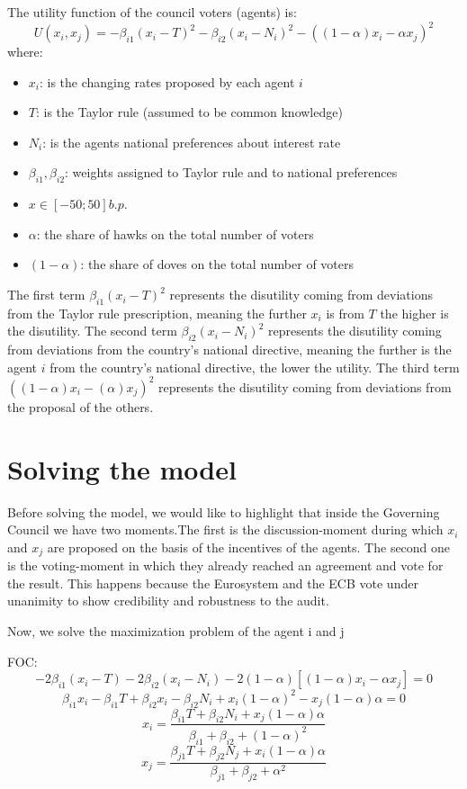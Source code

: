 \documentclass[12pt]{article}
\begin{document}
\vspace{8pt}
The utility function of the council voters (agents) is:
\[ U(x_i,x_{j})=-\beta_{i1}(x_i-T)^2-\beta_{i2} (x_i-N_i)^2 - ((1 - \alpha) x_i - \alpha x_j)^2\]
where:
\begin{itemize}
    \item $x_i$: is the changing rates proposed by each agent $i$
    \item $T$: is the Taylor rule (assumed to be common knowledge)
    \item $N_i$: is the agents national preferences about interest rate
    \item $\beta_{i1},\beta_{i2}$: weights assigned to Taylor rule and to national preferences
    \item $x\in[-50;50] b.p.$
    \item $\alpha$: the share of hawks on the total number of voters
    \item $(1-\alpha)$: the share of doves on the total number of voters
\end{itemize}
The first term $\beta_{i1}(x_i-T)^2$ represents the disutility coming from deviations from the Taylor rule prescription,
meaning the further  $x_i$ is from $T$ the higher is the disutility. The second term $ \beta_{i2}(x_i-N_i)^2$ represents
the disutility coming  from deviations from the country's national directive, meaning the further is the agent $i$ from
the country's national directive, the lower the utility. The third term $((1-\alpha)x_i-(\alpha)x_j)^2$ represents the disutility coming  from deviations from the proposal of the others.

\section{Solving the model}
Before solving the model, we would like to highlight that inside the Governing Council we have two moments.The first is the discussion-moment during which $x_i$ and $x_j$ are proposed on the basis of the incentives of the agents. The second one is the voting-moment in which they already reached an agreement and vote for the result. This happens because the Eurosystem and the ECB vote under unanimity to show credibility and robustness to the audit. 

Now, we solve the maximization problem of the agent i and j\par
FOC:
\[ -2\beta_{i1}(x_i-T)-2\beta_{i2}(x_i-N_i)-2(1 - \alpha) [(1 - \alpha) x_i - \alpha x_j]=0 \]
\[ \beta_{i1}x_i-\beta_{i1}T+\beta_{i2}x_i-\beta_{i2}N_i+ x_i (1 - \alpha)^2 - x_j (1 - \alpha)\alpha = 0 \]
\[ x_i = \frac{\beta_{i1} T + \beta_{i2}N_i + x_j (1 - \alpha)\alpha}{\beta_{i1} + \beta_{i2} + (1 - \alpha)^2}\]
\[ x_j = \frac{\beta_{j1} T+\beta_{j2}N_j+ x_i (1 - \alpha)\alpha}{\beta_{j1}+\beta_{j2}+\alpha^2}\]
\end{document}
